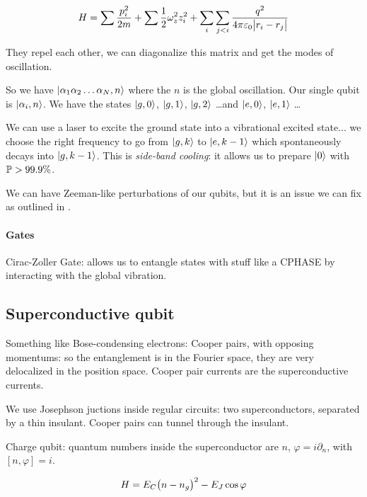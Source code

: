 \documentclass[main.tex]{subfiles}
\begin{document}
\begin{equation}
    H  = \sum  \frac{p_i^2}{2m} + \sum  \frac{1}{2} \omega_z^2 z_i^2
    + \sum_i \sum_{j<i} \frac{q^2}{4 \pi \varepsilon_0 \abs{r_i - r_j} }
\end{equation}

They repel each other, we can diagonalize this matrix and get the modes of oscillation.

So we have \(\ket{\alpha_1 \alpha_2 \dots \alpha_N, n} \) where the \(n\) is the global oscillation. Our single qubit is \(\ket{\alpha_i, n} \). We have the states \(\ket{g, 0} \), \(\ket{g, 1} \), \(\ket{g, 2} \) \dots and \(\ket{e, 0} \), \(\ket{e, 1} \) \dots

We can use a laser to excite the ground state into a vibrational excited state... we choose the right frequency to go from \(\ket{g, k} \) to \(\ket{e, k-1} \) which spontaneously decays into \(\ket{g, k-1} \). This is \emph{side-band cooling}: it allows us to prepare \(\ket{0}\) with \(\P > 99.9\%\).

We can have Zeeman-like perturbations of our qubits, but it is an issue we can fix as outlined in .

\paragraph{Gates}

Cirac-Zoller Gate: allows us to entangle states with stuff like a CPHASE by interacting with the global vibration.

\subsection{Superconductive qubit}

Something like Bose-condensing electrons: Cooper pairs, with opposing momentums: so the entanglement is in the Fourier space, they are very delocalized in the position space.
Cooper pair currents are the superconductive currents.

We use Josephson juctions inside regular circuits:
two superconductors, separated by a thin insulant. Cooper pairs can tunnel through the insulant.

Charge qubit: quantum numbers inside the superconductor are \(n\), \(\varphi = i \partial_n\), with \([n, \varphi] = i\).

\begin{equation}
    H = E_C \qty(n-n_g)^2 - E_J \cos \varphi
\end{equation}
\end{document}
